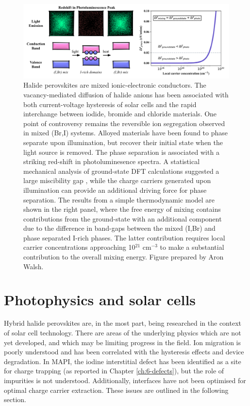 \begin{figure} 
\includegraphics[width=1.0\textwidth]{./figures/ch2/f4.png}
\caption[Simple phase segregation model]{
Halide perovskites are mixed ionic-electronic conductors. The vacancy-mediated diffusion of halide anions has been associated with both current-voltage hysteresis of solar cells and the rapid interchange between iodide, bromide and chloride materials.
One point of controversy remains the reversible ion segregation observed in mixed (Br,I) systems. 
Alloyed materials have been found to phase separate upon illumination, but recover their initial state when the light source is removed. 
The phase separation is associated with a striking red-shift in  photoluminesence spectra.
A statistical mechanical analysis of ground-state DFT calculations suggested a large miscibility gap \autocite{Brivio2016}, while the charge carriers generated upon illumination can provide an additional driving force for phase separation.\autocite{Slotcavage2016}
The results from a simple thermodynamic model are shown in the right panel, where the free energy of mixing contains contributions from the ground-state with an additional component due to the difference in band-gaps between the mixed (I,Br) and phase separated I-rich phases. 
The latter contribution requires local carrier concentrations approaching 10$^{21}$ cm$^{-3}$ to make a substantial contribution to the overall mixing energy. Figure prepared by Aron Walsh.
}
\label{fig4}
\end{figure}

\section{Photophysics and solar cells}

Hybrid halide perovskites are, in the most part, being researched in the context of solar cell technology.
There are areas of the underlying physics which are not yet developed, and which may be limiting progress in the field.
Ion migration is poorly understood and has been correlated with the hysteresis effects\autocite{Eames2015a,Richardson2016} and device degradation.
In MAPI, the iodine interstitial defect has been identified as a site for charge trapping\autocite{Whalley2017b} (as reported in Chapter \ref{ch:6-defects}), but the role of impurities is not understood. 
Additionally, interfaces have not been optimised for optimal charge carrier extraction.
These issues are outlined in the following section.

